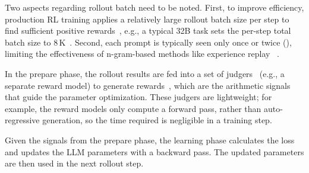 Two aspects regarding rollout batch need to be noted.
First, to improve efficiency, production RL training applies a relatively large
rollout batch size per step to find sufficient positive rewards~\cite{DBLP:conf/iclr/KeskarMNST17,DBLP:journals/corr/abs-2402-03300,DBLP:conf/nips/YaoGLKM18,dapo,gspo},
e.g., a typical 32B task
sets the per-step total batch size to {8\,K}~\cite{dapo,DBLP:journals/corr/abs-2504-05118}. 
Second, each prompt is typically seen only once or twice 
(),
limiting the effectiveness of n-gram-based methods like experience replay
~\cite{liu2025specrlacceleratingonpolicyreinforcement,rhymerl}.


In the prepare phase, the rollout results are fed into
a set of judgers~\cite{DBLP:journals/corr/abs-2402-03300,dapo,DBLP:journals/corr/abs-2504-02605,DBLP:journals/corr/abs-2509-02547}
(e.g., a separate reward model)
to generate rewards~\cite{DBLP:journals/corr/SchulmanWDRK17,DBLP:journals/corr/abs-2204-05862},
which are the arithmetic signals that guide the parameter optimization.
These judgers are lightweight; for example, the reward models only compute a forward pass,
rather than auto-regressive generation,
so the time required is negligible in a training step.

Given the signals from the prepare phase, the learning phase 
calculates the loss and updates the LLM parameters
with a backward pass.
The updated parameters are then used in the next rollout step. 



